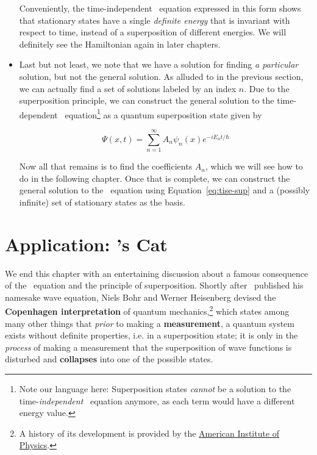 \begin{itemize}
	Conveniently, the time-independent \Sch\ equation expressed in this form shows that stationary states have a single \emph{definite energy} that is invariant with respect to time, instead of a superposition of different energies. We will definitely see the Hamiltonian again in later chapters.
	
	\item Last but not least, we note that we have a solution for finding \emph{a particular} solution, but not the general solution. As alluded to in the previous section, we can actually find a set of solutions labeled by an index $n$. Due to the superposition principle, we can construct the general solution to the time-dependent \Sch\ equation\footnote{Note our language here: Superposition states \emph{cannot} be a solution to the time-\emph{independent} \Sch\ equation anymore, as each term would have a different energy value.} as a quantum superposition state given by
	\begin{tcolorbox}[title = Superposition of states] \vspace{-2ex}
		\begin{equation}
		\Psi(x,t) = \sum_{n=1}^{\infty} A_n\psi_n(x)e^{-iE_nt/\hbar} \label{eq:tise-sup}
		\end{equation}
	\end{tcolorbox}
	Now all that remains is to find the coefficients $A_n$, which we will see how to do in the following chapter. Once that is complete, we can construct the general solution to the \Sch\ equation using Equation~\ref{eq:tise-sup} and a (possibly infinite) set of stationary states as the basis.
\end{itemize}


\section[\Sch's Cat]{Application: \Sch's Cat}
We end this chapter with an entertaining discussion about a famous consequence of the \Sch\ equation and the principle of superposition. Shortly after \Sch\ published his namesake wave equation, Niels Bohr and Werner Heisenberg devised the \textbf{Copenhagen interpretation} of quantum mechanics,\footnote{A history of its development is provided by the \href{http://history.aip.org/exhibits/heisenberg/p09.htm}{American Institute of Physics}.} which states among many other things that \emph{prior} to making a \textbf{measurement}, a quantum system exists without definite properties, i.e. in a superposition state; it is only in the \emph{process} of making a measurement that the superposition of wave functions is disturbed and \textbf{collapses} into one of the possible states. \par 

